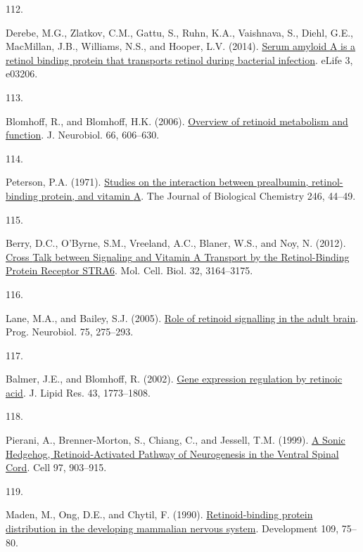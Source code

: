 \documentclass[
]{article}
\newlength{\cslhangindent}
\newlength{\csllabelwidth}
\newlength{\cslentryspacingunit} %
\newenvironment{CSLReferences}[2] %
 {%
  \setlength{\parindent}{0pt}
  \ifodd #1
  \let\oldpar\par
  \def\par{\hangindent=\cslhangindent\oldpar}
  \fi
  \setlength{\parskip}{#2\cslentryspacingunit}
 }%
 {}
\newcommand{\CSLLeftMargin}[1]{\parbox[t]{\csllabelwidth}{#1}}
\newcommand{\CSLRightInline}[1]{\parbox[t]{\linewidth - \csllabelwidth}{#1}\break}
\begin{document}
\begin{CSLReferences}{0}{0}
\leavevmode{}%
\CSLLeftMargin{112. }
\CSLRightInline{Derebe, M.G., Zlatkov, C.M., Gattu, S., Ruhn, K.A., Vaishnava, S., Diehl, G.E., MacMillan, J.B., Williams, N.S., and Hooper, L.V. (2014). \href{https://doi.org/10.7554/elife.03206}{Serum amyloid {A} is a retinol binding protein that transports retinol during bacterial infection}. eLife 3, e03206.}

\leavevmode{}%
\CSLLeftMargin{113. }
\CSLRightInline{Blomhoff, R., and Blomhoff, H.K. (2006). \href{https://doi.org/10.1002/neu.20242}{Overview of retinoid metabolism and function}. J. Neurobiol. 66, 606--630.}

\leavevmode{}%
\CSLLeftMargin{114. }
\CSLRightInline{Peterson, P.A. (1971). \href{https://www.ncbi.nlm.nih.gov/pubmed/5541771}{Studies on the interaction between prealbumin, retinol-binding protein, and vitamin {A}}. The Journal of Biological Chemistry 246, 44--49.}

\leavevmode{}%
\CSLLeftMargin{115. }
\CSLRightInline{Berry, D.C., O'Byrne, S.M., Vreeland, A.C., Blaner, W.S., and Noy, N. (2012). \href{https://doi.org/10.1128/MCB.00505-12}{Cross {Talk} between {Signaling} and {Vitamin A Transport} by the {Retinol-Binding Protein Receptor STRA6}}. Mol. Cell. Biol. 32, 3164--3175.}

\leavevmode{}%
\CSLLeftMargin{116. }
\CSLRightInline{Lane, M.A., and Bailey, S.J. (2005). \href{https://doi.org/10.1016/j.pneurobio.2005.03.002}{Role of retinoid signalling in the adult brain}. Prog. Neurobiol. 75, 275--293.}

\leavevmode{}%
\CSLLeftMargin{117. }
\CSLRightInline{Balmer, J.E., and Blomhoff, R. (2002). \href{https://doi.org/10.1194/jlr.R100015-JLR200}{Gene expression regulation by retinoic acid}. J. Lipid Res. 43, 1773--1808.}

\leavevmode{}%
\CSLLeftMargin{118. }
\CSLRightInline{Pierani, A., Brenner-Morton, S., Chiang, C., and Jessell, T.M. (1999). \href{https://doi.org/10.1016/S0092-8674(00)80802-8}{A {Sonic Hedgehog}\textendash{{Independent}}, {Retinoid-Activated Pathway} of {Neurogenesis} in the {Ventral Spinal Cord}}. Cell 97, 903--915.}

\leavevmode{}%
\CSLLeftMargin{119. }
\CSLRightInline{Maden, M., Ong, D.E., and Chytil, F. (1990). \href{https://www.ncbi.nlm.nih.gov/pubmed/2170099}{Retinoid-binding protein distribution in the developing mammalian nervous system}. Development 109, 75--80.}


\end{CSLReferences}
\end{document}
